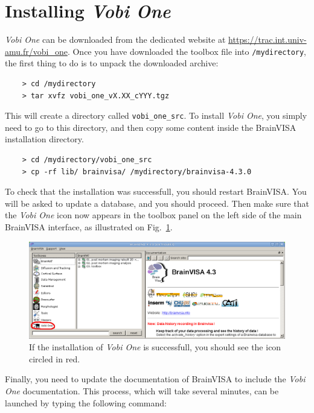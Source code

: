 \section{Installing {\em Vobi One}}

{\em Vobi One} can be downloaded from the dedicated website at \url{https://trac.int.univ-amu.fr/vobi_one}. Once you have downloaded the toolbox file into \texttt{/mydirectory}, the first thing to do is to unpack the downloaded archive:

\begin{verbatim}
    > cd /mydirectory
    > tar xvfz vobi_one_vX.XX_cYYY.tgz
\end{verbatim}

This will create a directory called \texttt{vobi\_one\_src}. To install {\em Vobi One}, you simply need to go to this directory, and then copy some content inside the BrainVISA installation directory.

\begin{verbatim}
    > cd /mydirectory/vobi_one_src
    > cp -rf lib/ brainvisa/ /mydirectory/brainvisa-4.3.0
\end{verbatim}


To check that the installation was successfull, you should restart BrainVISA. You will be asked to update a database, and you should proceed. Then make sure that the {\em Vobi One} icon now appears in the toolbox panel on the left side of the main BrainVISA interface, as illustrated on Fig.~\ref{fig:bv_gui_v1_install}.

\begin{figure}[!h]
\begin{center}
\includegraphics[width=12cm]{figs/brainvisa_gui_v1_install.png}
\caption{If the installation of {\em Vobi One} is successfull, you should see the icon circled in red.}
\label{fig:bv_gui_v1_install}
\end{center}
\end{figure}

Finally, you need to update the documentation of BrainVISA to include the {\em Vobi One} documentation. This process, which will take several minutes, can be launched by typing the following command:

